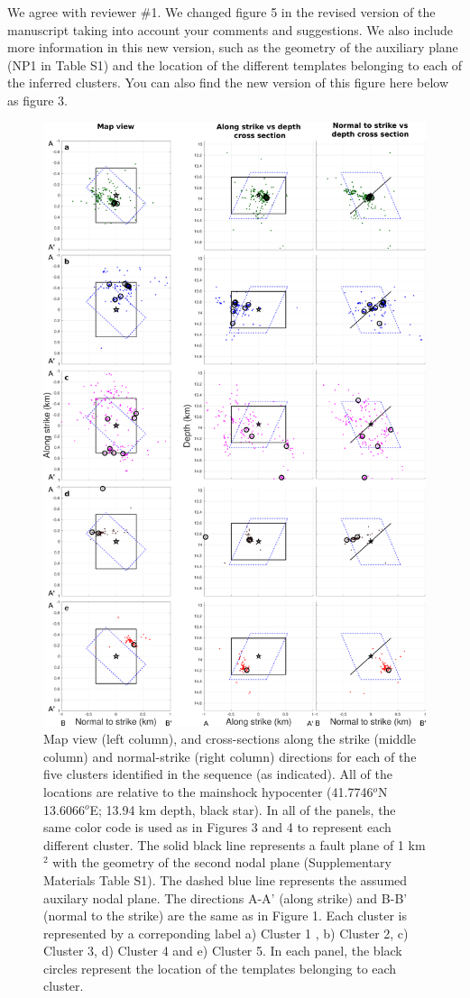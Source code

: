 \documentclass[10pt]{extarticle}
\begin{document}
\begin{Answer}
We agree with reviewer \#1. We changed figure 5 in the revised version of the manuscript taking into account your comments and suggestions. We also include more information in this new version, such as the geometry of the auxiliary plane (NP1 in Table S1) and the location of the different templates belonging to each of the inferred clusters. You can also find the new version of this figure here below as figure 3.
\begin{figure}[!h]
\begin{center}
 \includegraphics[width=0.75\linewidth]{map_clusters_templates}
\end{center}
\caption{Map view (left column), and cross-sections along the strike (middle column) and normal-strike (right column) directions for each of the five clusters identified in the sequence (as indicated). All of the locations are relative to the mainshock hypocenter (41.7746$^o$N 13.6066$^o$E; 13.94 km depth, black star). In all of the panels, the same color code is used as in Figures 3 and 4 to represent each different cluster. The solid black line represents a fault plane of 1 km$^2$ with the geometry of the second nodal plane (Supplementary Materials Table S1). The dashed blue line represents the assumed auxilary nodal plane. The directions A-A' (along strike) and B-B' (normal to the strike) are the same as in Figure 1. Each cluster is represented by a correponding label a) Cluster 1 , b) Cluster 2, c) Cluster 3, d) Cluster 4 and e) Cluster 5. In each panel, the black circles represent the location of the templates belonging to each cluster.}
\label{fig:map_improved}
\end{figure}
 \WorkInProgressRevTask
\end{Answer}
%
%
\end{document}
